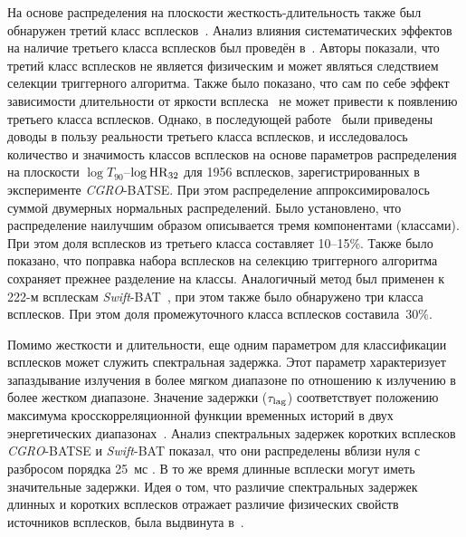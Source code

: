 На основе распределения на плоскости жесткость-длительность также был обнаружен 
третий класс всплесков~\citep{Mukherjee_1998, Hakkila_2000}. Анализ влияния 
систематических эффектов на наличие третьего класса всплесков был проведён 
в~\citep{Hakkila_2003}. Авторы показали, что третий класс всплесков не является 
физическим и может являться следствием селекции триггерного алгоритма. Также было 
показано, что сам по себе эффект зависимости длительности от яркости 
всплеска~\citep{Bonnell_1997} не может привести к появлению третьего класса всплесков. 
Однако, в последующей работе~\citep{Horvath_2006} были приведены доводы в пользу 
реальности третьего класса всплесков, и исследовалось количество и значимость 
классов всплесков на основе параметров распределения на плоскости 
$\log T_{90}$--$\log {\mathrm{HR}}_{32}$ для 1956 всплесков, зарегистрированных 
в эксперименте \textit{CGRO}-BATSE. При этом распределение аппроксимировалось 
суммой двумерных нормальных распределений. Было установлено, что распределение 
наилучшим образом описывается тремя компонентами (классами). При этом доля всплесков 
из третьего класса составляет 10--15\%. Также было показано, что поправка набора 
всплесков на селекцию триггерного алгоритма сохраняет прежнее разделение на классы. 
Аналогичный метод был применен к 222-м всплескам \textit{Swift}-BAT~\citep{Horvath_2010}, 
при этом также было обнаружено три класса всплесков. При этом доля промежуточного 
класса всплесков составила~30\%.

Помимо жесткости и длительности, еще одним параметром для классификации всплесков 
может служить спектральная задержка. Этот параметр характеризует запаздывание 
излучения в более мягком диапазоне по отношению к излучению в более жестком диапазоне. 
Значение задержки ($\tau_{{\mathrm{lag}}}$) соответствует положению  максимума 
кросскорреляционной функции временных историй в двух энергетических диапазонах~\citep{Norris_2000}. 
Анализ спектральных задержек коротких всплесков \textit{CGRO}-BATSE и 
\textit{Swift}-BAT показал, что они распределены вблизи нуля с разбросом 
порядка 25~мс \citep{Norris_and_Bonnel_2006, Norris2011}. В то же время длинные 
всплески могут иметь значительные задержки. Идея о том, что различие спектральных 
задержек длинных и коротких всплесков отражает различие физических свойств источников 
всплесков, была выдвинута в~\citep{Gehrels_2006_Nature}.


